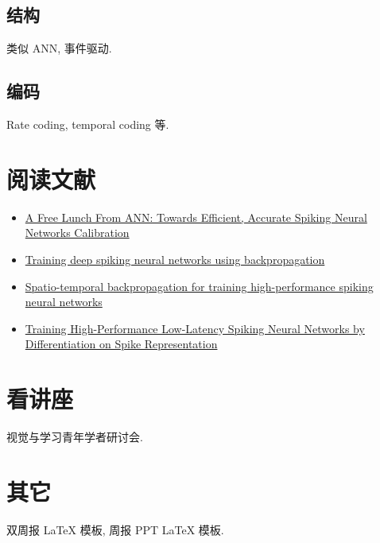 \documentclass[a4paper]{article}
\begin{document}
\subsection{结构}

类似 ANN, 事件驱动.

\subsection{编码}

Rate coding, temporal coding 等.

\section{阅读文献}

\begin{itemize}
    \item \href{http://proceedings.mlr.press/v139/li21d/li21d.pdf}{A Free Lunch From ANN: Towards Efficient, Accurate Spiking Neural Networks Calibration}
    \item \href{https://www.frontiersin.org/articles/10.3389/fnins.2016.00508/full}{Training deep spiking neural networks using backpropagation}
    \item \href{https://www.frontiersin.org/articles/10.3389/fnins.2018.00331/full}{Spatio-temporal backpropagation for training high-performance spiking neural networks}
    \item \href{https://openaccess.thecvf.com/content/CVPR2022/papers/Meng_Training_High-Performance_Low-Latency_Spiking_Neural_Networks_by_Differentiation_on_Spike_CVPR_2022_paper.pdf}{Training High-Performance Low-Latency Spiking Neural Networks by Differentiation on Spike Representation}
\end{itemize}

\section{看讲座}

视觉与学习青年学者研讨会.

\section{其它}

双周报 LaTeX 模板, 周报 PPT LaTeX 模板.
\end{document}
